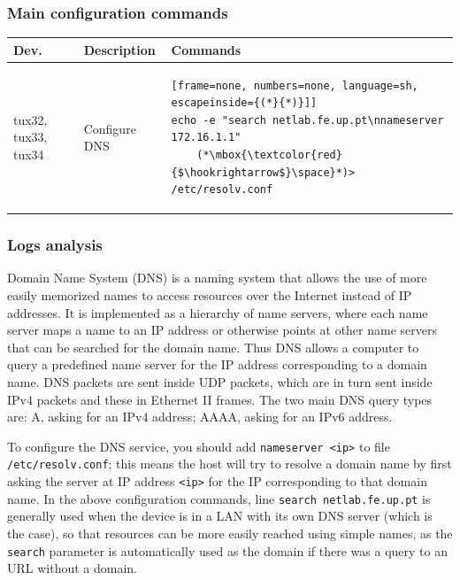 \documentclass[a4paper, 11pt]{report}
\begin{document}
\subsubsection{Main configuration commands} \label{sec:Com5}
\begin{center}
    \small
    \begin{tabular}{@{}l | m{29mm} | l@{}}
        {\normalfont\textbf{Dev.}} & {\normalfont\textbf{Description}} & {\normalfont\textbf{Commands}}  \\ \hline
        tux32, tux33, tux34      & Configure DNS & 
        \begin{lstlisting}[frame=none, numbers=none, language=sh, escapeinside={(*}{*)}]]
echo -e "search netlab.fe.up.pt\nnameserver 172.16.1.1"
    (*\mbox{\textcolor{red}{$\hookrightarrow$}\space}*)> /etc/resolv.conf
        \end{lstlisting}
    \end{tabular}
\end{center}
\subsubsection{Logs analysis} \label{sec:Log5}

Domain Name System (DNS) is a naming system that allows the use of more easily memorized names to access resources over the Internet instead of IP addresses.
It is implemented as a hierarchy of name servers, where each name server maps a name to an IP address or otherwise points at other name servers that can be searched for the domain name.
Thus DNS allows a computer to query a predefined name server for the IP address corresponding to a domain name.
DNS packets are sent inside UDP packets, which are in turn sent inside IPv4 packets and these in Ethernet II frames.
The two main DNS query types are: A, asking for an IPv4 address; AAAA, asking for an IPv6 address.

To configure the DNS service, you should add \texttt{nameserver <ip>} to file \texttt{/etc/resolv.conf}; this means the host will try to resolve a domain name by first asking the server at IP address \texttt{<ip>} for the IP corresponding to that domain name.
In the above configuration commands, line \texttt{search netlab.fe.up.pt} is generally used when the device is in a LAN with its own DNS server (which is the case), so that resources can be more easily reached using simple names, as the \texttt{search} parameter is automatically used as the domain if there was a query to an URL without a domain.
\end{document}
